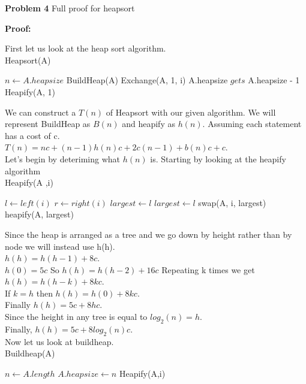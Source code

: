 \documentclass[12pt]{article}
\begin{document}
\par
\bigskip
{\bf Problem
    4
}
Full proof for heapsort
\par
\bigskip
{\bf Proof:}
\par
First let us look at the heap sort algorithm.\\
Heapsort(A)
\begin{algorithmic}
    \State $n \gets A.heapsize$
    \State BuildHeap(A)
        \State Exchange(A, 1, i)
        \State A.heapsize $gets $ A.heapsize - 1
        \State Heapify(A, 1)
\end{algorithmic}

We can construct a $T(n)$ of Heapsort with our given algorithm.
We will represent BuildHeap as $B(n)$ and heapify as $h(n)$.
Assuming each statement has a cost of c.\\

$T(n) = nc + (n-1)h(n)c + 2c(n - 1) + b(n)c + c$.\\

Let's begin by deteriming what $h(n)$ is. Starting by looking at the 
heapify algorithm\\

Heapify(A ,i)
\begin{algorithmic}
    \State $l \gets left(i)$
    \State $r \gets right(i)$
        \state $largest \gets l$
        \state $largest \gets l$
        \state swap(A, i, largest)
        \state heapify(A, largest)
\end{algorithmic}

Since the heap is arranged as a tree and we go down by height 
rather than by node we will instead use h(h).\\
$h(h) = h(h - 1) + 8c$.\\
$h(0) = 5c$
So $h(h) = h(h - 2) + 16c$
Repeating k times we get $h(h) = h(h - k) + 8kc$.\\
If $k = h$ then $h(h) = h(0) + 8kc$.\\
Finally $h(h) = 5c + 8hc$.\\
Since the height in any tree is equal to $log_{2}(n) = h$.\\
Finally, $h(h) = 5c + 8log_{2}(n)c$.\\
Now let us look at buildheap.\\
Buildheap(A)
\begin{algorithmic}
    \State $n \gets A.length$
    \State $A.heapsize \gets n$
        \State Heapify(A,i)
\end{algorithmic}
\end{document}
